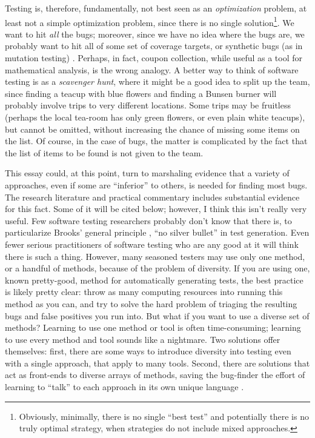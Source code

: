 \documentclass[sigplan]{acmart}
\begin{document}
Testing is, therefore,
fundamentally, not best seen as an \emph{optimization} problem, at
least not a simple optimization problem, since
there is no single solution\footnote{Obviously, minimally, there is no single ``best
test'' and potentially there is no truly optimal strategy, when strategies do not
include mixed approaches.}.  We want to hit \emph{all} the bugs; moreover, since we have
no idea where the bugs are, we probably want to hit all of some set of
coverage targets, or synthetic bugs (as in mutation testing)
\cite{Discontents}.  Perhaps, in fact, coupon collection, while useful
as a tool for mathematical analysis, is the wrong analogy.  A better
way to think of software testing is as a \emph{scavenger hunt}, where
it might be a good idea to split up the team, since finding a teacup
with blue flowers and finding a Bunsen burner will probably involve
trips to very different locations.  Some trips may be fruitless
(perhaps the local tea-room has only green flowers, or even plain white
teacups), but cannot be omitted, without increasing the chance of
missing some items on the list.  Of course, in the case of bugs, the
matter is complicated by the fact that the list of items to be found
is not given to the team.

This essay could, at this point, turn to marshaling evidence that a
variety of approaches, even if some are ``inferior'' to others, is
needed for finding most bugs.  The research literature and practical
commentary includes substantial evidence for this fact.  Some of it
will be cited below; however, I think this isn't really very useful.
Few software testing researchers probably don't know that there is, to
particularize Brooks' general principle \cite{Brooks1987NoSB}, ``no silver bullet'' in test
generation.  Even fewer serious practitioners of software testing who
are any good at it will think there is such a thing.  However, many
seasoned testers may use only one method, or a handful of methods,
because of the problem of diversity.  If you are using one, known
pretty-good, method for automatically generating tests, the best
practice is likely pretty clear:  throw as many computing resources
into running this method as you can, and try to solve the hard problem
of triaging the resulting bugs and false positives you run into.  But
what if you want to use a diverse set of methods?  Learning to use one
method or tool is often time-consuming; learning to use every method
and tool sounds like a nightmare.  Two solutions offer themselves:
first, there are some ways to introduce diversity into testing even
with a single approach, that apply to many tools.  Second, there are
solutions that act as front-ends to diverse arrays of methods, saving
the bug-finder the effort of learning to ``talk'' to each approach in
its own unique language \cite{WODACommon}.
\end{document}
